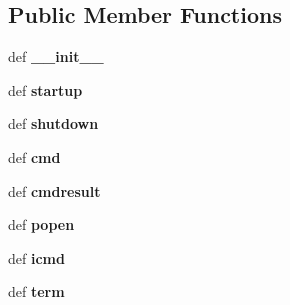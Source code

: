 \subsection*{Public Member Functions}
\begin{DoxyCompactItemize}
\item 
\hypertarget{classcore_1_1bsd_1_1vnode_1_1_simple_jail_node_a679945ddaa78fad4d74e5e2c2ba16478}{def {\bfseries \+\_\+\+\_\+init\+\_\+\+\_\+}}\label{classcore_1_1bsd_1_1vnode_1_1_simple_jail_node_a679945ddaa78fad4d74e5e2c2ba16478}

\item 
\hypertarget{classcore_1_1bsd_1_1vnode_1_1_simple_jail_node_aaf35b1ce1726197b10b00850c6bb00d4}{def {\bfseries startup}}\label{classcore_1_1bsd_1_1vnode_1_1_simple_jail_node_aaf35b1ce1726197b10b00850c6bb00d4}

\item 
\hypertarget{classcore_1_1bsd_1_1vnode_1_1_simple_jail_node_a46d9588afe6329dc023fd34e875a3e4d}{def {\bfseries shutdown}}\label{classcore_1_1bsd_1_1vnode_1_1_simple_jail_node_a46d9588afe6329dc023fd34e875a3e4d}

\item 
\hypertarget{classcore_1_1bsd_1_1vnode_1_1_simple_jail_node_afdcc68361e0a099db18ba958363ea788}{def {\bfseries cmd}}\label{classcore_1_1bsd_1_1vnode_1_1_simple_jail_node_afdcc68361e0a099db18ba958363ea788}

\item 
\hypertarget{classcore_1_1bsd_1_1vnode_1_1_simple_jail_node_a17de91fad7b0a7a2b6d1628f2ee01456}{def {\bfseries cmdresult}}\label{classcore_1_1bsd_1_1vnode_1_1_simple_jail_node_a17de91fad7b0a7a2b6d1628f2ee01456}

\item 
\hypertarget{classcore_1_1bsd_1_1vnode_1_1_simple_jail_node_a62a153efd8e0a478ee39991685699a94}{def {\bfseries popen}}\label{classcore_1_1bsd_1_1vnode_1_1_simple_jail_node_a62a153efd8e0a478ee39991685699a94}

\item 
\hypertarget{classcore_1_1bsd_1_1vnode_1_1_simple_jail_node_a8cf7c184eaa8c94cce71616add7e0393}{def {\bfseries icmd}}\label{classcore_1_1bsd_1_1vnode_1_1_simple_jail_node_a8cf7c184eaa8c94cce71616add7e0393}

\item 
\hypertarget{classcore_1_1bsd_1_1vnode_1_1_simple_jail_node_ac53e445e2c7a71fb56b01f0bb7822893}{def {\bfseries term}}\label{classcore_1_1bsd_1_1vnode_1_1_simple_jail_node_ac53e445e2c7a71fb56b01f0bb7822893}


\end{DoxyCompactItemize}
